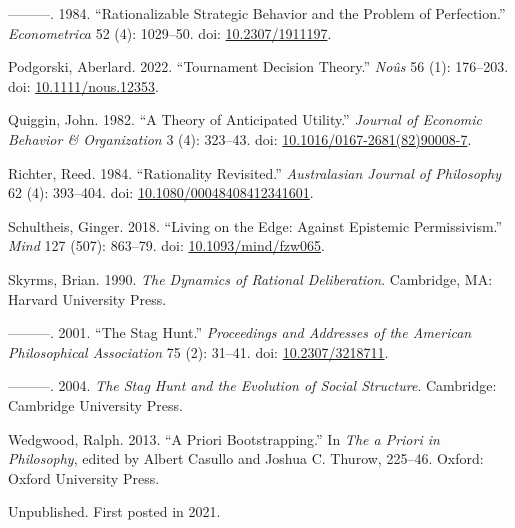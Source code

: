 \documentclass[
  10pt,
  letterpaper,
  DIV=11,
  numbers=noendperiod,
  twoside]{scrartcl}
\newlength{\cslhangindent}
\newenvironment{CSLReferences}[2] %
 {\begin{list}{}{%
  \setlength{\itemindent}{0pt}
  \setlength{\leftmargin}{0pt}
  \setlength{\parsep}{0pt}
  \ifodd #1
   \setlength{\leftmargin}{\cslhangindent}
   \setlength{\itemindent}{-1\cslhangindent}
  \fi
  \setlength{\itemsep}{#2\baselineskip}}}
 {\end{list}}
\begin{document}
\begin{CSLReferences}{1}{0}
---------. 1984. {``Rationalizable Strategic Behavior and the Problem of
Perfection.''} \emph{Econometrica} 52 (4): 1029--50. doi:
\href{https://doi.org/10.2307/1911197}{10.2307/1911197}.

Podgorski, Aberlard. 2022. {``Tournament Decision Theory.''}
\emph{No{û}s} 56 (1): 176--203. doi:
\href{https://doi.org/10.1111/nous.12353}{10.1111/nous.12353}.

Quiggin, John. 1982. {``A Theory of Anticipated Utility.''}
\emph{Journal of Economic Behavior \& Organization} 3 (4): 323--43. doi:
\href{https://doi.org/10.1016/0167-2681(82)90008-7}{10.1016/0167-2681(82)90008-7}.

Richter, Reed. 1984. {``Rationality Revisited.''} \emph{Australasian
Journal of Philosophy} 62 (4): 393--404. doi:
\href{https://doi.org/10.1080/00048408412341601}{10.1080/00048408412341601}.

Schultheis, Ginger. 2018. {``Living on the Edge: Against Epistemic
Permissivism.''} \emph{Mind} 127 (507): 863--79. doi:
\href{https://doi.org/10.1093/mind/fzw065}{10.1093/mind/fzw065}.

Skyrms, Brian. 1990. \emph{The Dynamics of Rational Deliberation}.
Cambridge, MA: Harvard University Press.

---------. 2001. {``The Stag Hunt.''} \emph{Proceedings and Addresses of
the American Philosophical Association} 75 (2): 31--41. doi:
\href{https://doi.org/10.2307/3218711}{10.2307/3218711}.

---------. 2004. \emph{The Stag Hunt and the Evolution of Social
Structure}. Cambridge: {C}ambridge {U}niversity {P}ress.

Wedgwood, Ralph. 2013. {``A Priori Bootstrapping.''} In \emph{The a
Priori in Philosophy}, edited by Albert Casullo and Joshua C. Thurow,
225--46. Oxford: Oxford University Press.

\end{CSLReferences}



Unpublished. First posted in 2021.
\end{document}
